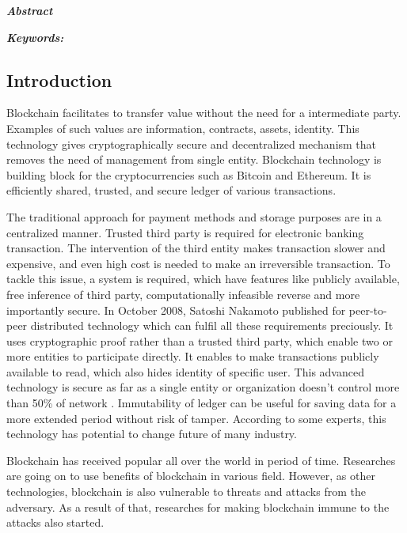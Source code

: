 \documentclass[a4paper,twoside,12pt]{report}
\begin{document}
\begin{spacing}{1}  %
\begingroup
\fontsize{12pt}{14pt}\selectfont
\begin{center}
	\Huge\bfseries
	\textit{Abstract}
\end{center}
\vspace{0.3in}
\textit{
\textbf{Keywords:} 
}
\endgroup
\end{spacing}
\begin{spacing}{1.5}
\tableofcontents
\listoffigures
\listoftables
\chapter{Introduction}
Blockchain facilitates to transfer value without the need for a intermediate party. Examples of such values are information, contracts, assets, identity. This technology gives cryptographically secure and decentralized mechanism that removes the need of management from single entity. Blockchain technology is building block for the cryptocurrencies such as Bitcoin and Ethereum. It is efficiently shared, trusted, and secure ledger of various transactions.  
\par
The traditional approach for payment methods and storage purposes are in a centralized manner. Trusted third party is required for electronic banking transaction. The intervention of the third entity makes transaction slower and expensive, and even high cost is needed to make an irreversible transaction. To tackle this issue, a system is required, which have features like publicly available, free inference of third party, computationally infeasible reverse and more importantly secure. In October 2008, Satoshi Nakamoto published for peer-to-peer distributed technology which can fulfil all these requirements preciously. It uses cryptographic proof rather than a trusted third party, which enable two or more entities to participate directly. It enables to make transactions publicly available to read, which also hides identity of specific user. This advanced technology is secure as far as a single entity or organization doesn't control more than 50\% of network \cite{satoshinakamoto}. Immutability of ledger can be useful for saving data for a more extended period without risk of tamper. According to some experts, this technology has potential to change future of many industry.
\par
Blockchain has received popular all over the world in period of time. Researches are going on to use benefits of blockchain in various field. However, as other technologies, blockchain is also vulnerable to threats and attacks from the adversary. As a result of that, researches for making blockchain immune to the attacks also started.         

\end{spacing}
\end{document}
